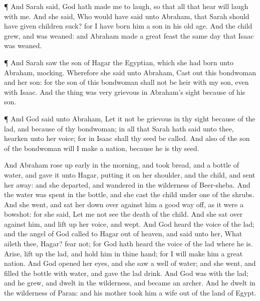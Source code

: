  ¶ And Sarah said, God hath made me to laugh, so that all
that hear will laugh with me.  And she said, Who would have
said unto Abraham, that Sarah should have given children suck? for I
have born him a son in his old age.  And the child grew, and
was weaned: and Abraham made a great feast the same day that Isaac was
weaned.

 ¶ And Sarah saw the son of Hagar the Egyptian, which she
had born unto Abraham, mocking.  Wherefore she said unto
Abraham, Cast out this bondwoman and her son: for the son of this
bondwoman shall not be heir with my son, even with Isaac. 
And the thing was very grievous in Abraham's sight because of his son.

 ¶ And God said unto Abraham, Let it not be grievous in thy
sight because of the lad, and because of thy bondwoman; in all that
Sarah hath said unto thee, hearken unto her voice; for in Isaac shall
thy seed be called.  And also of the son of the bondwoman
will I make a nation, because he is thy seed.

 And Abraham rose up early in the morning, and took bread,
and a bottle of water, and gave it unto Hagar, putting it on her
shoulder, and the child, and sent her away: and she departed, and
wandered in the wilderness of Beer-sheba.  And the water
was spent in the bottle, and she cast the child under one of the shrubs.
 And she went, and sat her down over against him a good way
off, as it were a bowshot: for she said, Let me not see the death of the
child. And she sat over against him, and lift up her voice, and wept.
 And God heard the voice of the lad; and the angel of God
called to Hagar out of heaven, and said unto her, What aileth thee,
Hagar? fear not; for God hath heard the voice of the lad where he is.
 Arise, lift up the lad, and hold him in thine hand; for I
will make him a great nation.  And God opened her eyes, and
she saw a well of water; and she went, and filled the bottle with water,
and gave the lad drink.  And God was with the lad; and he
grew, and dwelt in the wilderness, and became an archer. 
And he dwelt in the wilderness of Paran: and his mother took him a wife
out of the land of Egypt.

